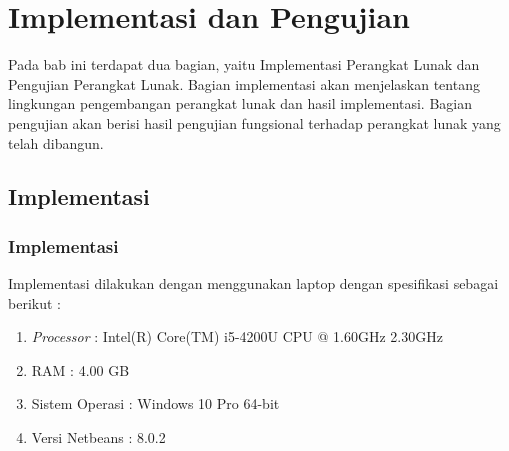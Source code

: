 \chapter{Implementasi dan Pengujian}
\label{chap:implementasi}

Pada bab ini terdapat dua bagian, yaitu Implementasi Perangkat Lunak dan Pengujian Perangkat Lunak. Bagian implementasi akan menjelaskan tentang lingkungan pengembangan perangkat lunak dan hasil implementasi. Bagian pengujian akan berisi hasil pengujian fungsional terhadap perangkat lunak yang telah dibangun.

\section{Implementasi}
\label{sec:implementasi}

\subsection{Implementasi}
Implementasi dilakukan dengan menggunakan laptop dengan spesifikasi sebagai berikut :
\begin{enumerate}
	\item \textit{Processor} : Intel(R) Core(TM) i5-4200U CPU @ 1.60GHz 2.30GHz
	\item RAM : 4.00 GB
	\item Sistem Operasi : Windows 10 Pro 64-bit
	\item Versi Netbeans : 8.0.2
\end{enumerate}

